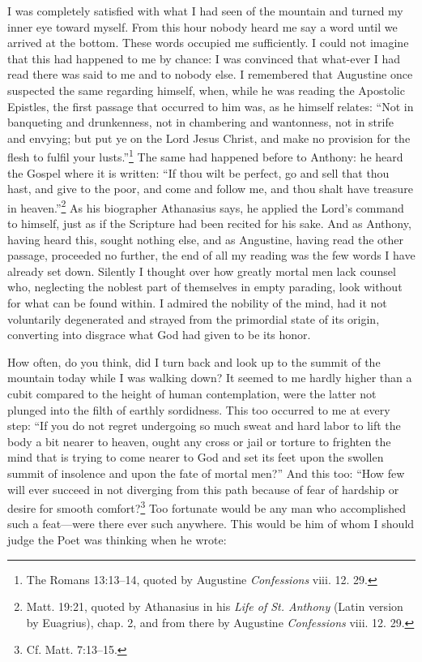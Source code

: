I was completely satisfied with what I had seen of the mountain and
turned my inner eye toward myself. From this hour nobody heard me say
a word until we arrived at the bottom. These words occupied me
sufficiently. I could not imagine that this had happened to me by
chance: I was convinced that what-ever I had read there was
said to me and to nobody else. I remembered that Augustine once
suspected the same regarding himself, when, while he was reading the
Apostolic Epistles, the first passage that occurred to him was, as he
himself relates: ``Not in banqueting and drunkenness, not in
chambering and wantonness, not in strife and envying; but put ye on
the Lord Jesus Christ, and make no provision for the flesh to fulfil
your lusts.''\footnote{The Romans 13:13--14, quoted by Augustine
\textit{Confessions} viii. 12. 29.} The same had happened before to
Anthony: he heard the Gospel where it is written: ``If thou wilt be
perfect, go and sell that thou hast, and give to the poor, and come
and follow me, and thou shalt have treasure in
heaven.''\footnote{Matt. 19:21, quoted by Athanasius in his
\textit{Life of St. Anthony} (Latin version by Euagrius), chap. 2, and
from there by Augustine \textit{Confessions} viii. 12. 29.} As his
biographer Athanasius says, he applied the Lord's command to himself,
just as if the Scripture had been recited for his sake. And as
Anthony, having heard this, sought nothing else, and as Angustine,
having read the other passage, proceeded no further, the end of all my
reading was the few words I have already set down. Silently I thought
over how greatly mortal men lack counsel who, neglecting the noblest
part of themselves in empty parading, look without for what can be
found within. I admired the nobility of the mind, had it not
voluntarily degenerated and strayed from the primordial state of its
origin, converting into disgrace what God had given to be its honor.

How often, do you think, did I turn back and look up to the summit of
the mountain today while I was walking down? It seemed to me hardly
higher than a cubit compared to the height of human contemplation,
were the latter not plunged into the filth of earthly sordidness. This
too occurred to me at every step: ``If you do not regret undergoing so
much sweat and hard labor to lift the body a bit nearer to heaven,
ought any cross or jail or torture to frighten the mind that is trying
to come nearer to God and set its feet upon the swollen summit of
insolence  and upon the fate of mortal men?'' And this too:
``How few will ever succeed in not diverging from this path because of
fear of hardship or desire for smooth comfort?\footnote{Cf. Matt.
7:13--15.} Too fortunate would be any man who accomplished such a
feat---were there ever such anywhere. This would be him of whom I
should judge the Poet was thinking when he wrote:

